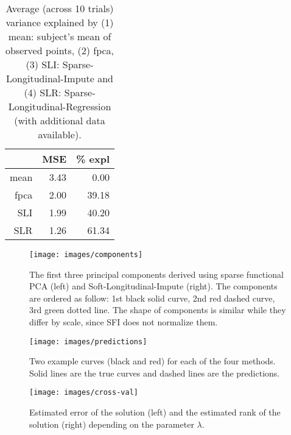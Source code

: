 \documentclass[preprint]{imsart}
\numberwithin{equation}{section}
\theoremstyle{plain}
\begin{document}
\begin{table}[ht]
\centering
\begin{tabular}{rrr}
  \hline
 & MSE & \% expl \\ 
  \hline
  mean & 3.43 & 0.00 \\ 
  fpca & 2.00 & 39.18 \\ 
  SLI & 1.99 & 40.20 \\ 
  SLR & 1.26 & 61.34 \\ 
   \hline
\end{tabular}\label{tbl:simulations}
\caption{Average (across 10 trials) variance explained by (1) mean: subject's mean of observed points, (2) fpca, (3) SLI: Sparse-Longitudinal-Impute and (4) SLR: Sparse-Longitudinal-Regression (with additional data available).}
\end{table}

\begin{figure}[h!]
  \texttt{[image: images/components]}
  \caption{The first three principal components derived using sparse functional PCA (left) and Soft-Longitudinal-Impute (right). The components are ordered as follow: 1st black solid curve, 2nd red dashed curve, 3rd green dotted line. The shape of components is similar while they differ by scale, since SFI does not normalize them.}
  \label{fig:principal-components}
\end{figure}

\begin{figure}[h!]
  \texttt{[image: images/predictions]}
  \caption{Two example curves (black and red) for each of the four methods. Solid lines are the true curves and dashed lines are the predictions. }
  \label{fig:example-predictions}
\end{figure}

\begin{figure}[h!]
  \texttt{[image: images/cross-val]}
  \caption{Estimated error of the solution (left) and the estimated rank of the solution (right) depending on the parameter $\lambda$.}
  \label{fig:estimated-rank}
\end{figure}


\end{document}
